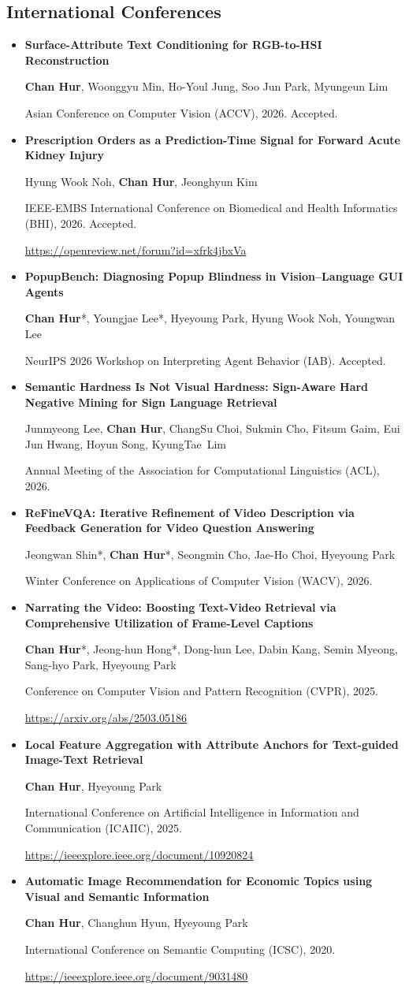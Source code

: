 \documentclass[10pt,a4paper]{article}
\newcommand{\me}{\textbf{Chan Hur}}
\newcommand{\cvpub}[3]{%
  \item\begin{minipage}[t]{\linewidth}
    \textbf{#1}\par
    #2\par
    #3\par
  \end{minipage}}
\begin{document}
\subsection{International Conferences}
\begin{itemize}
\cvpub{Surface-Attribute Text Conditioning for RGB-to-HSI Reconstruction}
  {\me, Woonggyu Min, Ho-Youl Jung, Soo Jun Park, Myungeun Lim}
  {Asian Conference on Computer Vision (ACCV), 2026. Accepted.}
\cvpub{Prescription Orders as a Prediction-Time Signal for Forward Acute Kidney Injury}
  {Hyung Wook Noh, \me, Jeonghyun Kim}
  {IEEE-EMBS International Conference on Biomedical and Health Informatics (BHI), 2026. Accepted.
   \par\url{https://openreview.net/forum?id=xfrk4jbxVa}}
\cvpub{PopupBench: Diagnosing Popup Blindness in Vision–Language GUI Agents}
  {\me*, Youngjae Lee*, Hyeyoung Park, Hyung Wook Noh, Youngwan Lee}
  {NeurIPS 2026 Workshop on Interpreting Agent Behavior (IAB). Accepted.}
\cvpub{Semantic Hardness Is Not Visual Hardness: Sign-Aware Hard Negative Mining for Sign Language Retrieval}
  {Junmyeong Lee, \me, ChangSu Choi, Sukmin Cho, Fitsum Gaim, Eui Jun Hwang, Hoyun Song, KyungTae~Lim}
  {Annual Meeting of the Association for Computational Linguistics (ACL), 2026.}
\cvpub{ReFineVQA: Iterative Refinement of Video Description via Feedback Generation for Video Question Answering}
  {Jeongwan Shin*, \me*, Seongmin Cho, Jae-Ho Choi, Hyeyoung Park}
  {Winter Conference on Applications of Computer Vision (WACV), 2026.}
\cvpub{Narrating the Video: Boosting Text-Video Retrieval via Comprehensive Utilization of Frame-Level Captions}
  {\me*, Jeong-hun Hong*, Dong-hun Lee, Dabin Kang, Semin Myeong, Sang-hyo Park, Hyeyoung Park}
  {Conference on Computer Vision and Pattern Recognition (CVPR), 2025.
   \par\url{https://arxiv.org/abs/2503.05186}}
\cvpub{Local Feature Aggregation with Attribute Anchors for Text-guided Image-Text Retrieval}
  {\me, Hyeyoung Park}
  {International Conference on Artificial Intelligence in Information and Communication (ICAIIC), 2025.
   \par\url{https://ieeexplore.ieee.org/document/10920824}}
\cvpub{Automatic Image Recommendation for Economic Topics using Visual and Semantic Information}
  {\me, Changhun Hyun, Hyeyoung Park}
  {International Conference on Semantic Computing (ICSC), 2020.
   \par\url{https://ieeexplore.ieee.org/document/9031480}}

\end{itemize}
\end{document}
